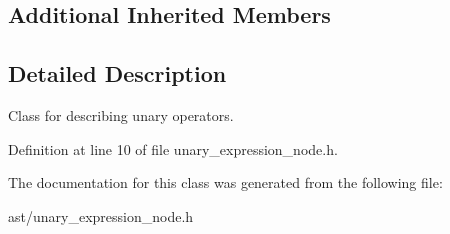 \subsection*{Additional Inherited Members}


\subsection{Detailed Description}
Class for describing unary operators. 

Definition at line 10 of file unary\+\_\+expression\+\_\+node.\+h.



The documentation for this class was generated from the following file\+:\begin{DoxyCompactItemize}
\item 
ast/unary\+\_\+expression\+\_\+node.\+h\end{DoxyCompactItemize}
